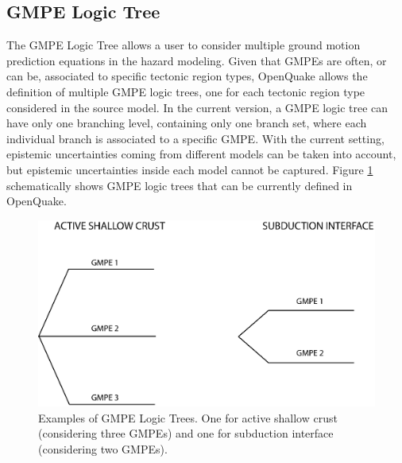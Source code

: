 \subsection{GMPE Logic Tree}
\label{hazard:gmpe_logic_tree}
The GMPE Logic Tree allows a user to consider multiple ground motion prediction
equations in the hazard modeling. Given that GMPEs are often, or can be, 
associated to specific tectonic region types, OpenQuake allows the definition 
of multiple GMPE logic trees, one for each tectonic region type considered in 
the source model. In the current version, a GMPE logic tree can have only one 
branching level, containing only one branch set, where each individual branch 
is associated to a specific GMPE. With the current setting, epistemic 
uncertainties coming from different models can be taken into account, but 
epistemic uncertainties inside each model cannot be captured.
Figure \ref{fig:GMPELogicTree} schematically shows GMPE logic trees that can 
be currently defined in OpenQuake.
% 
\begin{figure}
\includegraphics[width=15cm]{./Figures/Part_Hazard/GMPELogicTree.eps}
\caption{Examples of GMPE Logic Trees. One for active shallow crust (considering
three GMPEs) and one for subduction interface (considering two GMPEs).}
\label{fig:GMPELogicTree}
\end{figure}
%